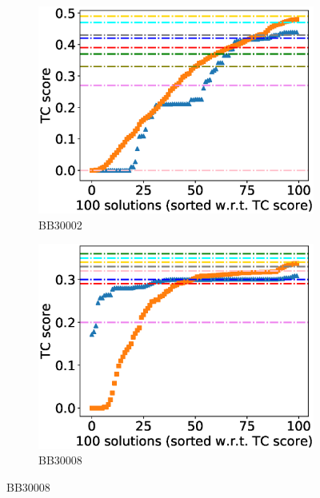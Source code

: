 \begin{figure}[!htbp]
	
	\begin{adjustwidth}{-1cm}{-1cm}
		\centering
		\begin{subfigure}{0.22\textwidth}
			\includegraphics[width=\columnwidth]{Figure/summary/precomputedInit/Balibase/BB30002_tc_density_single_run_2}
			\caption{BB30002}
		\end{subfigure}	
		\begin{subfigure}{0.22\textwidth}
			\includegraphics[width=\columnwidth]{Figure/summary/precomputedInit/Balibase/BB30008_tc_density_single_run_2}
			\caption{BB30008}
		\end{subfigure}

\end{adjustwidth}
\end{figure}
